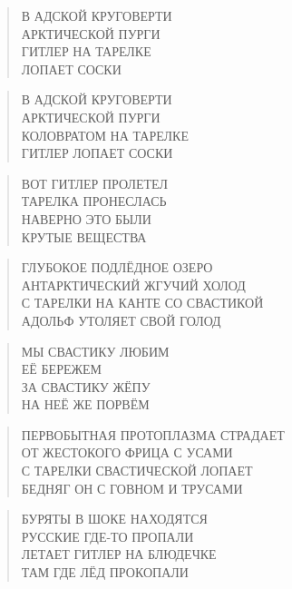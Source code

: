 \poemtitle{***}
\begin{verse}
В АДСКОЙ КРУГОВЕРТИ \\
АРКТИЧЕСКОЙ ПУРГИ\\
ГИТЛЕР НА ТАРЕЛКЕ\\
ЛОПАЕТ СОСКИ
\end{verse}

\poemtitle{***}
\begin{verse}
В АДСКОЙ КРУГОВЕРТИ\\
АРКТИЧЕСКОЙ ПУРГИ\\
КОЛОВРАТОМ НА ТАРЕЛКЕ\\
ГИТЛЕР ЛОПАЕТ СОСКИ
\end{verse}

\poemtitle{***}
\begin{verse}
ВОТ ГИТЛЕР ПРОЛЕТЕЛ\\
ТАРЕЛКА ПРОНЕСЛАСЬ\\
НАВЕРНО ЭТО БЫЛИ\\
КРУТЫЕ ВЕЩЕСТВА
\end{verse}

\poemtitle{***}
\begin{verse}
ГЛУБОКОЕ ПОДЛЁДНОЕ ОЗЕРО\\
АНТАРКТИЧЕСКИЙ ЖГУЧИЙ ХОЛОД\\
С ТАРЕЛКИ НА КАНТЕ СО СВАСТИКОЙ\\
АДОЛЬФ УТОЛЯЕТ СВОЙ ГОЛОД
\end{verse}

\poemtitle{***}
\begin{verse}
МЫ СВАСТИКУ ЛЮБИМ\\
ЕЁ БЕРЕЖЕМ\\
ЗА СВАСТИКУ ЖЁПУ\\
НА НЕЁ ЖЕ ПОРВЁМ
\end{verse}

\poemtitle{***}
\begin{verse}
ПЕРВОБЫТНАЯ ПРОТОПЛАЗМА СТРАДАЕТ\\
ОТ ЖЕСТОКОГО ФРИЦА С УСАМИ\\
С ТАРЕЛКИ СВАСТИЧЕСКОЙ ЛОПАЕТ\\
БЕДНЯГ ОН С ГОВНОМ И ТРУСАМИ
\end{verse}

\poemtitle{***}
\begin{verse}
БУРЯТЫ В ШОКЕ НАХОДЯТСЯ\\
РУССКИЕ ГДЕ-ТО ПРОПАЛИ\\
ЛЕТАЕТ  ГИТЛЕР НА БЛЮДЕЧКЕ\\
ТАМ ГДЕ ЛЁД ПРОКОПАЛИ
\end{verse}

